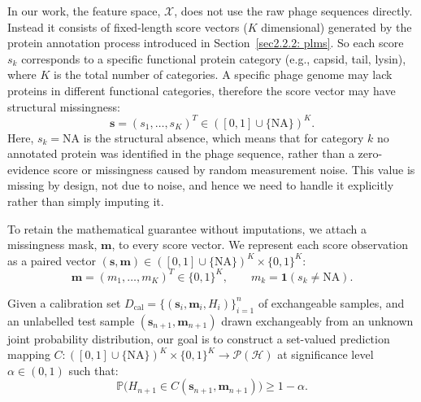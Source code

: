 In our work, the feature space, $\mathcal{X}$, does not use the raw phage sequences directly. Instead it 
consists of fixed-length score vectors ($K$ dimensional) generated by the protein annotation process introduced in 
Section~\ref{sec2.2.2: plms}. So each score $s_k$ corresponds to a specific functional protein category (e.g., capsid, 
tail, lysin), where $K$ is the total number of categories. A specific phage genome may lack proteins in different 
functional categories, therefore the score vector may have structural missingness:
\begin{equation*}
\mathbf{s} = (s_1, \ldots, s_K)^T \in ([0,1] \cup \{\text{NA}\})^K.
\end{equation*}
\noindent Here, $s_k = \text{NA}$ is the structural absence, which means that for category $k$ no annotated protein 
was identified in the phage sequence, rather than a zero-evidence score or missingness caused by random measurement noise.
This value is missing by design, not due to noise, and hence we need to handle it explicitly rather than simply imputing it.

To retain the mathematical guarantee without imputations, we attach a missingness mask, $\mathbf{m}$, to every 
score vector. We represent each score observation as a paired vector $(\mathbf{s}, \mathbf{m}) \in ([0,1] \cup 
\{\text{NA}\})^K \times \{0,1\}^K$:
\begin{equation*}
\mathbf{m} = (m_1, \ldots, m_K)^T \in \{0,1\}^K, \qquad m_k = \mathbf{1}(s_k \neq \text{NA}).
\end{equation*}

\newpage
Given a calibration set $D_{\text{cal}} = \{(\mathbf{s}_i, \mathbf{m}_i, H_i)\}_{i=1}^n$ of exchangeable samples,
and an unlabelled test sample $(\mathbf{s}_{n+1}, \mathbf{m}_{n+1})$ drawn exchangeably from an unknown joint probability 
distribution, our goal is to construct a set-valued prediction mapping $C: ([0,1] \cup \{\text{NA}\})^K \times \{0,1\}^K 
\to \mathcal{P} (\mathcal{H})$ at significance level $\alpha \in (0,1)$ such that:
\begin{equation*}
\label{eq: coverage with missingness}
\mathbb{P}\Big( H_{n+1} \in C(\mathbf{s}_{n+1}, \mathbf{m}_{n+1}) \Big) \ge 1 - \alpha.
\end{equation*}

